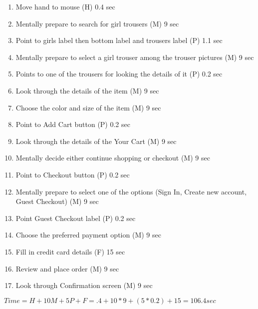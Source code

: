 \documentclass[a4paper,12pt]{scrartcl}
\begin{document}
\begin{enumerate}
  \item Move hand to mouse (H) 0.4 sec
  \item Mentally prepare to search for girl trousers (M) 9 sec
  \item Point to girls label then bottom label and trousers label (P) 1.1 sec
  \item Mentally prepare to select a girl trouser among the trouser pictures (M) 9 sec
  \item Points to one of the trousers  for looking the details of it (P) 0.2 sec
  \item Look through the details of the item (M) 9 sec
  \item Choose the color and size of the item (M) 9 sec
  \item Point to Add Cart button (P) 0.2 sec
  \item Look through the details of the Your Cart (M) 9 sec
  \item Mentally decide either continue shopping or checkout (M) 9 sec
  \item Point to Checkout button (P) 0.2 sec
  \item Mentally prepare to select one of the options (Sign In, Create new account, Guest Checkout) (M) 9 sec
  \item Point Guest Checkout label (P) 0.2 sec
  \item Choose the preferred payment option (M) 9 sec
  \item Fill in credit card details (F) 15 sec
  \item Review and place order (M) 9 sec
  \item Look through Confirmation screen (M) 9 sec
\end{enumerate}


$Time=H+10M+5P+F=.4+10*9+(5*0.2)+15 = 106.4 sec$
\end{document}
